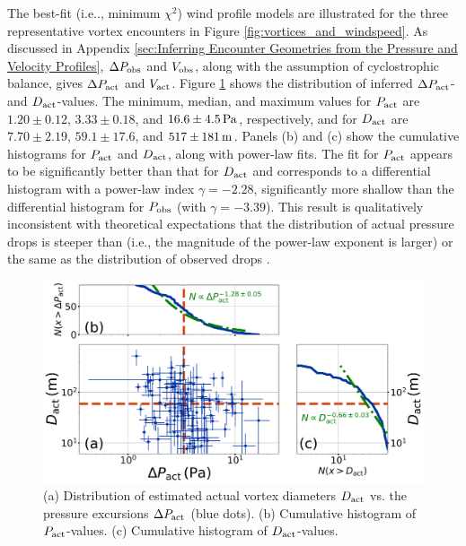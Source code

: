 \documentclass[linenumbers,trackchanges]{aastex63}
\begin{document}
The best-fit (i.e.., minimum $\chi^2$) wind profile models are illustrated for the three representative vortex encounters in Figure \ref{fig:vortices_and_windspeed}. As discussed in Appendix \ref{sec:Inferring Encounter Geometries from the Pressure and Velocity Profiles}, $\Delta P_{\rm obs}$ and $V_{\rm obs}$, along with the assumption of cyclostrophic balance, gives $\Delta P_{\rm act}$ and $V_{\rm act}$. Figure \ref{fig:Dact_vs_Pact} shows the distribution of inferred $\Delta P_{\rm act}$- and $D_{\rm act}$-values. The minimum, median, and maximum values for $P_{\rm act}$ are $1.20\pm0.12$, $3.33\pm0.18$, and $16.6\pm4.5\,{\rm Pa}$, respectively, and for $D_{\rm act}$ are $7.70\pm2.19$, $59.1\pm17.6$, and $517\pm181\,{\rm m}$. Panels (b) and (c) show the cumulative histograms for $P_{\rm act}$ and $D_{\rm act}$, along with power-law fits. The fit for $P_{\rm act}$ appears to be significantly better than that for $D_{\rm act}$ and corresponds to a differential histogram with a power-law index $\gamma = -2.28$, significantly more shallow than the differential histogram for $P_{\rm obs}$ (with $\gamma = -3.39$). This result is qualitatively inconsistent with theoretical expectations that the distribution of actual pressure drops is steeper than (i.e., the magnitude of the power-law exponent is larger) or the same as the distribution of observed drops \citep{2014JAtS...71.4461L, 2018Icar..299..166J, 2019Icar..317..209K}.

\begin{figure}
    \centering
    \includegraphics[width=\textwidth]{figures/Dact_vs_Pact.png}
    \caption{(a) Distribution of estimated actual vortex diameters $D_{\rm act}$ vs. the pressure excursions $\Delta P_{\rm act}$ (blue dots). (b) Cumulative histogram of $P_{\rm act}$-values. (c) Cumulative histogram of $D_{\rm act}$-values.}
    \label{fig:Dact_vs_Pact}
\end{figure}
\end{document}
